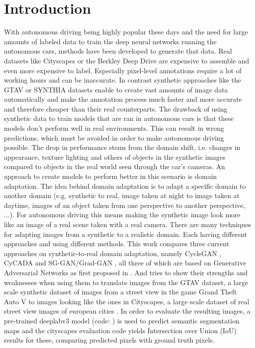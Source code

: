 \chapter{Introduction}
\label{sec:introduction}
With autonomous driving being highly popular these days and the need for large amounts of labeled data to train the deep neural networks running the autonomous cars, methods have been developed to generate that data. Real datasets like Cityscapes \cite{Cordts_2016_CVPR} or the Berkley Deep Drive \cite{DBLP:journals/corr/abs-1805-04687} are expensive to assemble and even more expensive to label. Especially pixel-level annotations require a lot of working hours and can be inaccurate. In contrast synthetic approaches like the GTAV \cite{Richter_2016_ECCV} or SYNTHIA datasets \cite{RosCVPR16} enable to create vast amounts of image data automatically and make the annotation process much faster and more accurate and therefore cheaper than their real counterparts. The drawback of using synthetic data to train models that are ran in autonomous cars is that these models don't perform well in real environments. This can result in wrong predictions, which must be avoided in order to make autonomous driving possible. The drop in performance stems from the domain shift, i.e. changes in appearance, texture lighting and others of objects in the synthetic images compared to objects in the real world seen through the car's cameras. An approach to create models to perform better in this scenario is domain adaptation. The idea behind domain adaptation is to adapt a specific domain to another domain (e.g. synthetic to real, image taken at night to image taken at daytime, images of an object taken from one perspective to another perspective, ...). For autonomous driving this means making the synthetic image look more like an image of a real scene taken with a real camera. There are many techniques for adapting images from a synthetic to a realistic domain. Each having different approaches and using different methods. This work compares three current approaches on synthetic-to-real domain adaptation, namely CycleGAN \cite{DBLP:journals/corr/ZhuPIE17}, CyCADA \cite{DBLP:journals/corr/abs-1711-03213} and SG-GAN/Grad-GAN \cite{DBLP:journals/corr/abs-1801-01726}, all three of which are based on Generative Adversarial Networks as first proposed in \cite{NIPS2014_5423}. And tries to show their strengths and weaknesses when using them to translate images from the GTAV dataset, a large scale synthetic dataset of images from a street view in the game Grand Theft Auto V \cite{Richter_2016_ECCV} to images looking like the ones in Cityscapes, a large scale dataset of real street view images of european cities \cite{Cordts_2016_CVPR}. In order to evaluate the resulting images, a pre-trained deeplabv3 \cite{DBLP:journals/corr/ChenPSA17} model (code: \cite{DLR}) is used to predict semantic segmentation maps and the cityscapes evaluation code \cite{CSR} yields Intersection over Union (IoU) results for these, comparing predicted pixels with ground truth pixels. 